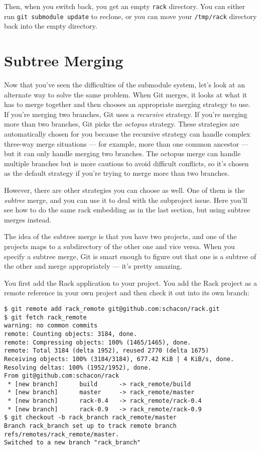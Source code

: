 \documentclass[a4paper]{book}
\begin{document}
Then, when you switch back, you get an empty \texttt{rack} directory. You can either run \texttt{git submodule update} to reclone, or you can move your \texttt{/tmp/rack} directory back into the empty directory.

\section{Subtree Merging}\label{subtree-merging}

Now that you've seen the difficulties of the submodule system, let's look at an alternate way to solve the same problem. When Git merges, it looks at what it has to merge together and then chooses an appropriate merging strategy to use. If you're merging two branches, Git uses a \emph{recursive} strategy. If you're merging more than two branches, Git picks the \emph{octopus} strategy. These strategies are automatically chosen for you because the recursive strategy can handle complex three-way merge situations --- for example, more than one common ancestor --- but it can only handle merging two branches. The octopus merge can handle multiple branches but is more cautious to avoid difficult conflicts, so it's chosen as the default strategy if you're trying to merge more than two branches.

However, there are other strategies you can choose as well. One of them is the \emph{subtree} merge, and you can use it to deal with the subproject issue. Here you'll see how to do the same rack embedding as in the last section, but using subtree merges instead.

The idea of the subtree merge is that you have two projects, and one of the projects maps to a subdirectory of the other one and vice versa. When you specify a subtree merge, Git is smart enough to figure out that one is a subtree of the other and merge appropriately --- it's pretty amazing.

You first add the Rack application to your project. You add the Rack project as a remote reference in your own project and then check it out into its own branch:

\begin{shaded}\begin{verbatim}
$ git remote add rack_remote git@github.com:schacon/rack.git
$ git fetch rack_remote
warning: no common commits
remote: Counting objects: 3184, done.
remote: Compressing objects: 100% (1465/1465), done.
remote: Total 3184 (delta 1952), reused 2770 (delta 1675)
Receiving objects: 100% (3184/3184), 677.42 KiB | 4 KiB/s, done.
Resolving deltas: 100% (1952/1952), done.
From git@github.com:schacon/rack
 * [new branch]      build      -> rack_remote/build
 * [new branch]      master     -> rack_remote/master
 * [new branch]      rack-0.4   -> rack_remote/rack-0.4
 * [new branch]      rack-0.9   -> rack_remote/rack-0.9
$ git checkout -b rack_branch rack_remote/master
Branch rack_branch set up to track remote branch refs/remotes/rack_remote/master.
Switched to a new branch "rack_branch"
\end{verbatim}\end{shaded}
\end{document}
